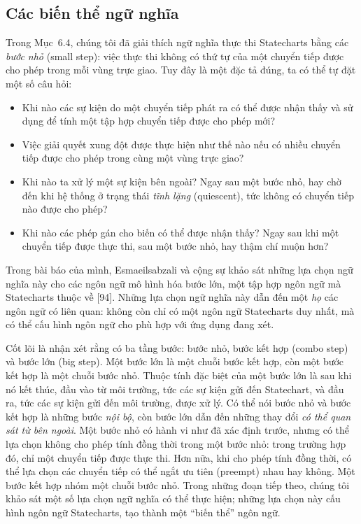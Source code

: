 \subsection{Các biến thể ngữ nghĩa}
Trong Mục~6.4, chúng tôi đã giải thích ngữ nghĩa thực thi Statecharts bằng các \emph{bước nhỏ} (small step): việc thực thi không có thứ tự của một chuyển tiếp được cho phép trong mỗi vùng trực giao. Tuy đây là một đặc tả đúng, ta có thể tự đặt một số câu hỏi:
\begin{itemize}
\item Khi nào các sự kiện do một chuyển tiếp phát ra có thể được nhận thấy và sử dụng để tính một tập hợp chuyển tiếp được cho phép mới?
\item Việc giải quyết xung đột được thực hiện như thế nào nếu có nhiều chuyển tiếp được cho phép trong cùng một vùng trực giao?
\item Khi nào ta xử lý một sự kiện bên ngoài? Ngay sau một bước nhỏ, hay chờ đến khi hệ thống ở trạng thái \emph{tĩnh lặng} (quiescent), tức không có chuyển tiếp nào được cho phép?
\item Khi nào các phép gán cho biến có thể được nhận thấy? Ngay sau khi một chuyển tiếp được thực thi, sau một bước nhỏ, hay thậm chí muộn hơn?
\end{itemize}

Trong bài báo của mình, Esmaeilsabzali và cộng sự khảo sát những lựa chọn ngữ nghĩa này cho các ngôn ngữ mô hình hóa bước lớn, một tập hợp ngôn ngữ mà Statecharts thuộc về [94]. Những lựa chọn ngữ nghĩa này dẫn đến một \emph{họ} các ngôn ngữ có liên quan: không còn chỉ có một ngôn ngữ Statecharts duy nhất, mà có thể cấu hình ngôn ngữ cho phù hợp với ứng dụng đang xét.

Cốt lõi là nhận xét rằng có ba tầng bước: bước nhỏ, bước kết hợp (combo step) và bước lớn (big step). Một bước lớn là một chuỗi bước kết hợp, còn một bước kết hợp là một chuỗi bước nhỏ. Thuộc tính đặc biệt của một bước lớn là sau khi nó kết thúc, đầu vào từ môi trường, tức các sự kiện gửi đến Statechart, và đầu ra, tức các sự kiện gửi đến môi trường, được xử lý. Có thể nói bước nhỏ và bước kết hợp là những bước \emph{nội bộ}, còn bước lớn dẫn đến những thay đổi \emph{có thể quan sát từ bên ngoài}. Một bước nhỏ có hành vi như đã xác định trước, nhưng có thể lựa chọn không cho phép tính đồng thời trong một bước nhỏ: trong trường hợp đó, chỉ một chuyển tiếp được thực thi. Hơn nữa, khi cho phép tính đồng thời, có thể lựa chọn các chuyển tiếp có thể ngắt ưu tiên (preempt) nhau hay không. Một bước kết hợp nhóm một chuỗi bước nhỏ. Trong những đoạn tiếp theo, chúng tôi khảo sát một số lựa chọn ngữ nghĩa có thể thực hiện; những lựa chọn này cấu hình ngôn ngữ Statecharts, tạo thành một ``biến thể'' ngôn ngữ.

